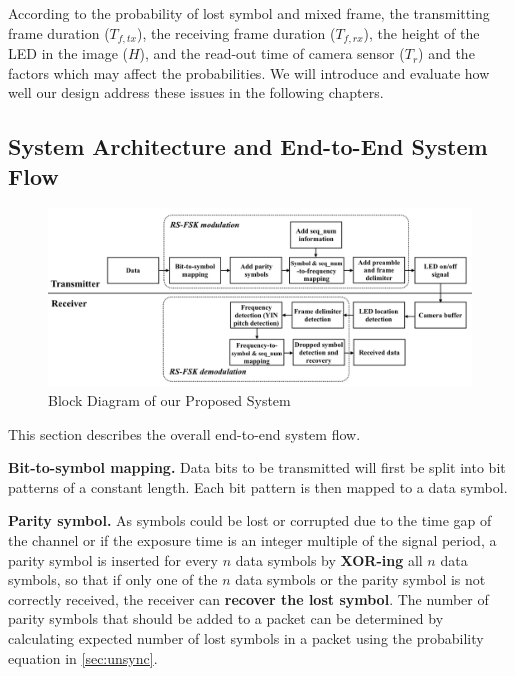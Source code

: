 According to the probability of lost symbol and mixed frame, the transmitting frame duration ($T_{f,tx}$), the receiving frame duration ($T_{f,rx}$), the height of the LED in the image ($H$), and the read-out time of camera sensor ($T_r$) and the factors which may affect the probabilities. We will introduce and evaluate how well our design address these issues in the following chapters.

\subsection{System Architecture and End-to-End System Flow}
\begin{figure}[!htb]
	\hspace{-3em}
	\includegraphics[scale=0.375]{fig/arch.png} 
	\caption{Block Diagram of our Proposed System}
	\label{fig:SystemArchitecture}
\end{figure}

This section describes the overall end-to-end system flow.

\textbf{Bit-to-symbol mapping.} Data bits to be transmitted will first be split into bit patterns of a constant length. Each bit pattern is then mapped to a data symbol.

\textbf{Parity symbol.} As symbols could be lost or corrupted due to the time gap of the channel or if the exposure time is an integer multiple of the signal period,
a parity symbol is inserted for every $n$ data symbols by \textbf{XOR-ing} all $n$ data symbols, so that if only one of the $n$ data symbols or the parity symbol is not correctly received, the receiver can \textbf{recover the lost symbol}. The number of parity symbols that should be added to a packet can be determined by calculating expected number of lost symbols in a packet using the probability equation in \autoref{sec:unsync}.

